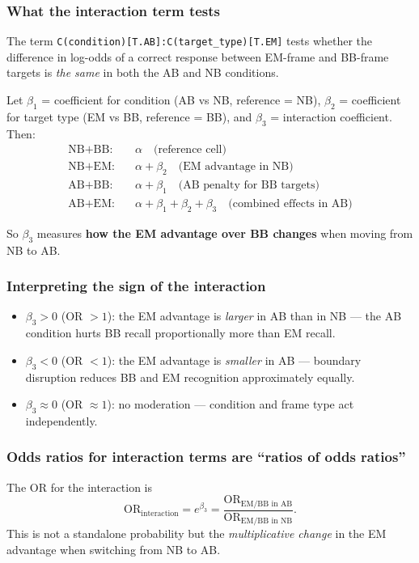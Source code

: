 \documentclass[12pt,a4paper]{article}
\begin{document}
\subsubsection{What the interaction term tests}

The term \texttt{C(condition)[T.AB]:C(target\_type)[T.EM]} tests whether the difference in
log-odds of a correct response between EM-frame and BB-frame targets is \emph{the same} in
both the AB and NB conditions.

Let $\beta_1$ = coefficient for condition (AB vs NB, reference = NB), $\beta_2$ = coefficient
for target type (EM vs BB, reference = BB), and $\beta_3$ = interaction coefficient. Then:
\begin{align*}
\text{NB} + \text{BB:} &\quad \alpha \quad \text{(reference cell)} \\
\text{NB} + \text{EM:} &\quad \alpha + \beta_2 \quad \text{(EM advantage in NB)} \\
\text{AB} + \text{BB:} &\quad \alpha + \beta_1 \quad \text{(AB penalty for BB targets)} \\
\text{AB} + \text{EM:} &\quad \alpha + \beta_1 + \beta_2 + \beta_3 \quad \text{(combined effects in AB)}
\end{align*}

So $\beta_3$ measures \textbf{how the EM advantage over BB changes} when moving from NB to AB.

\subsubsection{Interpreting the sign of the interaction}
\begin{itemize}[nosep]
  \item $\beta_3 > 0$ (OR $> 1$): the EM advantage is \emph{larger} in AB than in NB --- the AB condition hurts BB recall proportionally more than EM recall.
  \item $\beta_3 < 0$ (OR $< 1$): the EM advantage is \emph{smaller} in AB --- boundary disruption reduces BB and EM recognition approximately equally.
  \item $\beta_3 \approx 0$ (OR $\approx 1$): no moderation --- condition and frame type act independently.
\end{itemize}

\subsubsection{Odds ratios for interaction terms are ``ratios of odds ratios''}
The OR for the interaction is
$$\text{OR}_\text{interaction} = e^{\beta_3} = \frac{\text{OR}_{\text{EM/BB in AB}}}{\text{OR}_{\text{EM/BB in NB}}}.$$
This is not a standalone probability but the \emph{multiplicative change} in the EM advantage
when switching from NB to AB.
\end{document}
